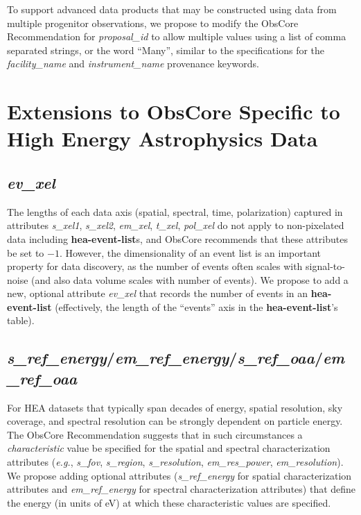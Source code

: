 \documentclass[11pt,a4paper]{ivoa}
\begin{document}
To support advanced data products that may be constructed using data from multiple progenitor observations, we propose to modify the ObsCore Recommendation for {\em proposal\_id\/} to allow multiple values using a list of comma separated strings, or the word ``Many'', similar to the specifications for the {\em facility\_name\/} and {\em instrument\_name\/} provenance keywords.


\pagebreak
\section{Extensions to ObsCore Specific to High Energy Astrophysics Data}
\label{sec:obscoreext}

\subsection{{\em ev\_xel}}

The lengths of each data axis (spatial, spectral, time, polarization) captured in attributes {\em s\_xel1\/}, {\em s\_xel2\/}, {\em em\_xel\/}, {\em t\_xel\/}, {\em pol\_xel\/} do not apply to non-pixelated data including {\bf hea-event-list}s, and ObsCore recommends that these attributes be set to $-1$.  However, the dimensionality of an event list is an important property for data discovery, as the number of events often scales with signal-to-noise (and also data volume scales with number of events).  We propose to add a new, optional attribute {\em ev\_xel\/} that records the number of events in an {\bf hea-event-list} (effectively, the length of the ``events'' axis in the {\bf hea-event-list}'s table).

\subsection{{\em s\_ref\_energy\/}/{\em em\_ref\_energy\/}/{\em s\_ref\_oaa\/}/{\em em\_ref\_oaa}}

For \gls{HEA} datasets that typically span decades of energy, spatial resolution, sky coverage, and spectral resolution can be strongly dependent on particle energy. The ObsCore Recommendation suggests that in such circumstances a {\em characteristic\/} value be specified for the spatial and spectral characterization attributes ({\em e.g.\/}, {\em s\_fov\/}, {\em s\_region\/}, {\em s\_resolution\/}, {\em em\_res\_power\/}, {\em em\_resolution\/}). We propose adding optional attributes ({\em s\_ref\_energy\/} for spatial characterization attributes and {\em em\_ref\_energy\/} for spectral characterization attributes) that define the energy (in units of eV) at which these characteristic values are specified.
\end{document}
